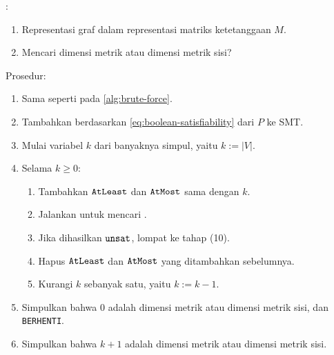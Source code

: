 \begin{algorithm}[H]
	:
	\begin{enumerate}
		\item Representasi graf dalam representasi matriks ketetanggaan \(M\).
		\item Mencari dimensi metrik atau dimensi metrik sisi?
	\end{enumerate}
	Prosedur:
	\begin{enumerate}
		\item[1--5.] Sama seperti pada \autoref{alg:brute-force}.
		\setcounter{enumi}{5}
		\item Tambahkan  berdasarkan \autoref{eq:boolean-satisfiability} dari \(P\) ke  SMT.
		\item Mulai variabel \(k\) dari banyaknya simpul, yaitu \(k := |V|\).
		\item Selama \(k \geq 0\):
			\begin{enumerate}
					\item Tambahkan  \(\mathtt{AtLeast}\) dan \(\mathtt{AtMost}\) sama dengan \(k\).
					\item Jalankan  untuk mencari .
					\item Jika dihasilkan \(\mathtt{unsat}\), lompat ke tahap (10).
					\item Hapus  \(\mathtt{AtLeast}\) dan \(\mathtt{AtMost}\) yang ditambahkan sebelumnya.
					\item Kurangi \(k\) sebanyak satu, yaitu \(k := k - 1\).
			\end{enumerate}
		\item Simpulkan bahwa 0 adalah dimensi metrik atau dimensi metrik sisi, dan \texttt{BERHENTI}.
		\item Simpulkan bahwa \(k + 1\) adalah dimensi metrik atau dimensi metrik sisi.
	\end{enumerate}
	\caption{}
	\label{alg:boolean-satisfiability}
\end{algorithm}

\subsection{}

